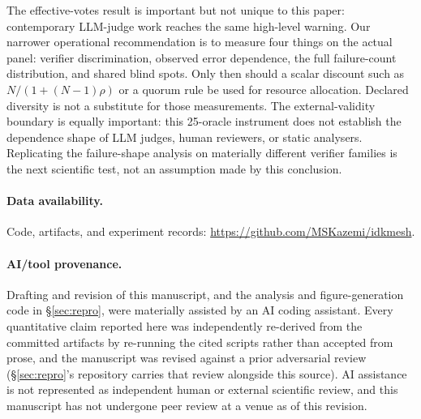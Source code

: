 \documentclass[11pt,a4paper]{article}
\begin{document}
The effective-votes result is important but not unique to this paper: contemporary
LLM-judge work reaches the same high-level warning. Our narrower operational
recommendation is to measure four things on the actual panel: verifier
discrimination, observed error dependence, the full failure-count distribution,
and shared blind spots. Only then should a scalar discount such as
$N/(1+(N-1)\rho)$ or a quorum rule be used for resource allocation. Declared
diversity is not a substitute for those measurements. The external-validity
boundary is equally important: this 25-oracle instrument does not establish the
dependence shape of LLM judges, human reviewers, or static analysers. Replicating
the failure-shape analysis on materially different verifier families is the next
scientific test, not an assumption made by this conclusion.

\paragraph{Data availability.} Code, artifacts, and experiment records:
\url{https://github.com/MSKazemi/idkmesh}.

\paragraph{AI/tool provenance.} Drafting and revision of this manuscript, and the
analysis and figure-generation code in \S\ref{sec:repro}, were materially
assisted by an AI coding assistant. Every quantitative claim
reported here was independently re-derived from the committed artifacts by
re-running the cited scripts rather than accepted from prose, and the
manuscript was revised against a prior adversarial review
(\S\ref{sec:repro}'s repository carries that review alongside this source).
AI assistance is not represented as independent human or external scientific
review, and this manuscript has not undergone peer review at a venue as of
this revision.



\end{document}
